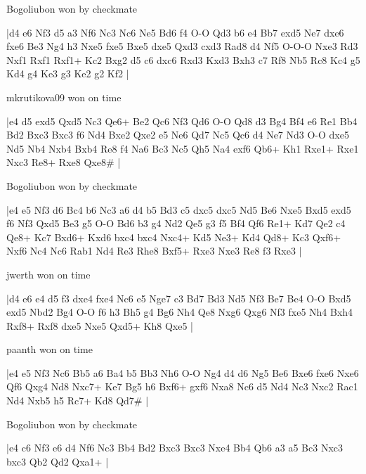 \showboard

Bogoliubon won by checkmate

\makegametitle
|d4 e6 Nf3 d5 a3 Nf6 Nc3 Nc6 Ne5 Bd6 f4 O-O Qd3 b6 e4 Bb7 exd5 Ne7 dxe6 fxe6 Be3 Ng4 h3 Nxe5 fxe5 Bxe5 dxe5 Qxd3 cxd3 Rad8 d4 Nf5 O-O-O Nxe3 Rd3 Nxf1 Rxf1 Rxf1+ Kc2 Bxg2 d5 c6 dxc6 Rxd3 Kxd3 Bxh3 c7 Rf8 Nb5 Rc8 Kc4 g5 Kd4 g4 Ke3 g3 Ke2 g2 Kf2  |

\showboard

mkrutikova09 won on time

\makegametitle
|e4 d5 exd5 Qxd5 Nc3 Qe6+ Be2 Qc6 Nf3 Qd6 O-O Qd8 d3 Bg4 Bf4 e6 Re1 Bb4 Bd2 Bxc3 Bxc3 f6 Nd4 Bxe2 Qxe2 e5 Ne6 Qd7 Nc5 Qc6 d4 Ne7 Nd3 O-O dxe5 Nd5 Nb4 Nxb4 Bxb4 Re8 f4 Na6 Bc3 Nc5 Qh5 Na4 exf6 Qb6+ Kh1 Rxe1+ Rxe1 Nxc3 Re8+ Rxe8 Qxe8\#  |

\showboard

Bogoliubon won by checkmate

\makegametitle
|e4 e5 Nf3 d6 Bc4 b6 Nc3 a6 d4 b5 Bd3 c5 dxc5 dxc5 Nd5 Be6 Nxe5 Bxd5 exd5 f6 Nf3 Qxd5 Be3 g5 O-O Bd6 b3 g4 Nd2 Qe5 g3 f5 Bf4 Qf6 Re1+ Kd7 Qe2 c4 Qe8+ Kc7 Bxd6+ Kxd6 bxc4 bxc4 Nxc4+ Kd5 Ne3+ Kd4 Qd8+ Kc3 Qxf6+ Nxf6 Nc4 Nc6 Rab1 Nd4 Re3 Rhe8 Bxf5+ Rxe3 Nxe3 Re8 f3 Rxe3  |

\showboard

jwerth won on time

\makegametitle
|d4 e6 e4 d5 f3 dxe4 fxe4 Nc6 e5 Nge7 c3 Bd7 Bd3 Nd5 Nf3 Be7 Be4 O-O Bxd5 exd5 Nbd2 Bg4 O-O f6 h3 Bh5 g4 Bg6 Nh4 Qe8 Nxg6 Qxg6 Nf3 fxe5 Nh4 Bxh4 Rxf8+ Rxf8 dxe5 Nxe5 Qxd5+ Kh8 Qxe5  |

\showboard

paanth won on time

\makegametitle
|e4 e5 Nf3 Nc6 Bb5 a6 Ba4 b5 Bb3 Nh6 O-O Ng4 d4 d6 Ng5 Be6 Bxe6 fxe6 Nxe6 Qf6 Qxg4 Nd8 Nxc7+ Ke7 Bg5 h6 Bxf6+ gxf6 Nxa8 Nc6 d5 Nd4 Nc3 Nxc2 Rac1 Nd4 Nxb5 h5 Rc7+ Kd8 Qd7\#  |

\showboard

Bogoliubon won by checkmate

\makegametitle
|e4 c6 Nf3 e6 d4 Nf6 Nc3 Bb4 Bd2 Bxc3 Bxc3 Nxe4 Bb4 Qb6 a3 a5 Bc3 Nxc3 bxc3 Qb2 Qd2 Qxa1+  |

